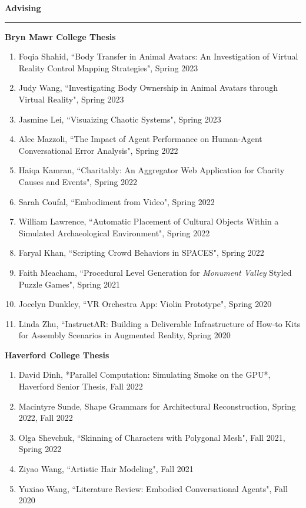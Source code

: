 \needspace{6em}
{\large {\bf Advising}}
\vspace{0.1cm}
\hrule
\medskip
\medskip

{\bf Bryn Mawr College Thesis }
\vspace{-1.0em}

\begin{enumerate}[leftmargin=*,label={}]
\item Foqia Shahid, ``Body Transfer in Animal Avatars: An Investigation of Virtual Reality Control Mapping Strategies", Spring 2023
\item Judy Wang, ``Investigating Body Ownership in Animal Avatars through Virtual Reality", Spring 2023
\item Jasmine Lei, ``Visuaizing Chaotic Systems", Spring 2023
\item Alec Mazzoli, ``The Impact of Agent Performance on Human-Agent Conversational Error Analysis", Spring 2022
\item Haiqa Kamran, ``Charitably: An Aggregator Web Application for Charity Causes and Events", Spring 2022
\item Sarah Coufal, ``Embodiment from Video", Spring 2022
\item William Lawrence, ``Automatic Placement of Cultural Objects Within a Simulated Archaeological Environment", Spring 2022
\item Faryal Khan, ``Scripting Crowd Behaviors in SPACES", Spring 2022 
\item Faith Meacham, ``Procedural Level Generation for \textit{Monument Valley} Styled Puzzle Games", Spring 2021
\item Jocelyn Dunkley, ``VR Orchestra App: Violin Prototype", Spring 2020
\item Linda Zhu, ``InstructAR: Building a Deliverable Infrastructure of How-to Kits for Assembly Scenarios in Augmented Reality, Spring 2020
\end{enumerate}

{\bf Haverford College Thesis}
\vspace{-1.0em}

\begin{enumerate}[leftmargin=*,label={}]
\item David Dinh, *Parallel Computation: Simulating Smoke on the GPU*, Haverford Senior Thesis, Fall 2022 
\item Macintyre Sunde, Shape Grammars for Architectural Reconstruction, Spring 2022, Fall 2022
\item Olga Shevchuk, ``Skinning of Characters with Polygonal Mesh", Fall 2021, Spring 2022
\item Ziyao Wang, ``Artistic Hair Modeling", Fall 2021
\item Yuxiao Wang, ``Literature Review: Embodied Conversational Agents", Fall 2020
\end{enumerate}

